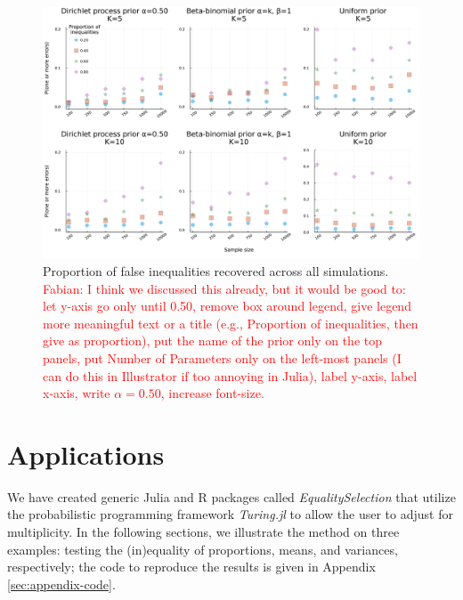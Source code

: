 \documentclass[11pt,a4paper]{article}
\theoremstyle{definition} %
\theoremstyle{case}
\newcommand{\FD}[1]{\textcolor{red}{Fabian: #1 }}
\begin{document}
\begin{figure}
    \centering
    \includegraphics[width=\textwidth]{figures/simulation_results_test_clean_figures/simulation_manuscript.pdf}
    \caption{Proportion of false inequalities recovered across all simulations. \FD{I think we discussed this already, but it would be good to: let y-axis go only until 0.50, remove box around legend, give legend more meaningful text or a title (e.g., Proportion of inequalities, then give as proportion), put the name of the prior only on the top panels, put Number of Parameters only on the left-most panels (I can do this in Illustrator if too annoying in Julia), label y-axis, label x-axis, write $\alpha = 0.50$, increase font-size.}}
    \label{fig:big_simulation}
\end{figure}

\section{Applications} \label{sec:applications}
We have created generic Julia and R packages called \textit{EqualitySelection} that utilize the probabilistic programming framework \textit{Turing.jl} to allow the user to adjust for multiplicity. In the following sections, we illustrate the method on three examples: testing the (in)equality of proportions, means, and variances, respectively; the code to reproduce the results is given in Appendix \ref{sec:appendix-code}.


\iffalse
\end{document}
